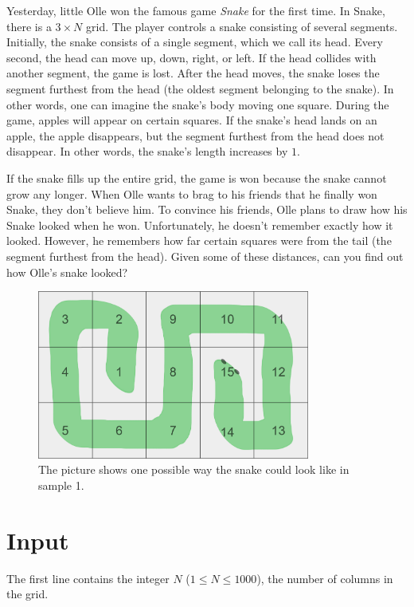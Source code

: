 \noindent
Yesterday, little Olle won the famous game \textit{Snake} for the first time. 
In Snake, there is a $3 \times N$ grid. The player controls a snake consisting of several segments. 
Initially, the snake consists of a single segment, which we call its head. 
Every second, the head can move up, down, right, or left. If the head collides with another segment, the game is lost. 
After the head moves, the snake loses the segment furthest from the head (the oldest segment belonging to the snake). 
In other words, one can imagine the snake's body moving one square. During the game, apples will appear on certain squares. 
If the snake's head lands on an apple, the apple disappears, but the segment furthest from the head does not disappear. 
In other words, the snake's length increases by $1$.

If the snake fills up the entire grid, the game is won because the snake cannot grow any longer. 
When Olle wants to brag to his friends that he finally won Snake, they don't believe him. 
To convince his friends, Olle plans to draw how his Snake looked when he won. 
Unfortunately, he doesn't remember exactly how it looked. However, he remembers how far certain squares were from the tail (the segment furthest from the head). 
Given some of these distances, can you find out how Olle's snake looked?

\begin{centering}
  \begin{figure}[h]
      \centering
      \includegraphics[width=0.8\textwidth]{snake.png}
      \caption{The picture shows one possible way the snake could look like in sample 1.}
  \end{figure}
\end{centering}

\section*{Input}
\noindent
The first line contains the integer $N$ ($1 \leq N \leq 1000$), 
the number of columns in the grid.


